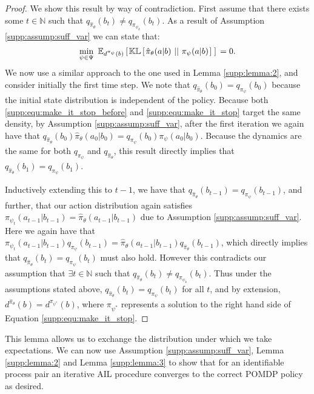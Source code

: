 \begin{proof}
    We show this result by way of contradiction.  First assume that there exists some $t \in \mathbb{N}$ such that $q_{\hat{\pi}_{\theta}}(b_t) \neq q_{\pi_{\psi_k}}(b_t)$.  As a result of Assumption \ref{supp:assump:suff_var} we can state that:
    \begin{equation}
            \min_{\psi \in \Psi} \ \mathbb{E}_{d^{\pi_{\psi}}(b)} \lspsqb{}  \mathbb{KL} \lspsqb{}  {\hat{\pi}_{\theta}}(a|b) \klbars{}  \pi_{\psi}(a|b) \rspsqb{}  \rspsqb{}  = 0.
    \end{equation}
    We now use a similar approach to the one used in Lemma \ref{supp:lemma:2}, and consider initially the first time step.  We note that $q_{\hat{\pi}_{\theta}}(b_0) = q_{\pi_{\psi}}(b_0)$ because the initial state distribution is independent of the policy.  Because both \eqref{supp:equ:make_it_stop_before} and \eqref{supp:equ:make_it_stop} target the same density, by Assumption \ref{supp:assump:suff_var}, after the first iteration we again have that $q_{\hat{\pi}_{\theta}}(b_0)\hat{\pi}_{\theta}(a_0|b_0) = q_{\pi_{\psi}}(b_0)\pi_{\psi}(a_0|b_0)$. Because the dynamics are the same for both $q_{\pi_{\psi}}$ and $q_{\hat{\pi}_{\theta}}$, this result directly implies that $q_{\hat{\pi}_{\theta}}(b_{1}) = q_{\pi_{\psi}}(b_{1})$.
    
    Inductively extending this to $t-1$, we have that $q_{\hat{\pi}_{\theta}}(b_{t-1}) = q_{\pi_{\psi}}(b_{t-1})$, and further, that our action distribution again satisfies  $\pi_{\psi_t}(a_{t-1}|b_{t-1}) = \hat{\pi}_{\theta}(a_{t-1}|b_{t-1})$ due to Assumption \ref{supp:assump:suff_var}. Here we again have that $\pi_{\psi_t}(a_{t-1}|b_{t-1})q_{\pi_{\psi}}(b_{t-1}) = \hat{\pi}_{\theta}(a_{t-1}|b_{t-1})q_{\hat{\pi}_{\theta}}(b_{t-1})$, which directly implies that $q_{\hat{\pi}_{\theta}}(b_{t}) = q_{\pi_{\psi}}(b_{t})$ must also hold. However this contradicts our assumption that $\exists t \in \mathbb{N}$ such that  $q_{\hat{\pi}_{\theta}}(b_t) \neq q_{\pi_{\psi_k}}(b_t)$. Thus under the assumptions stated above, $q_{\hat{\pi}_{\theta}}(b_t) = q_{\pi_{\psi}}(b_t)$ for all $t$, and by extension, $d^{\hat{\pi}_{\theta}}(b) = d^{\pi_{\psi^*}}(b)$, where $\pi_{\psi^*}$ represents a solution to the right hand side of Equation \eqref{supp:equ:make_it_stop}. 
\end{proof}

This lemma allows us to exchange the distribution under which we take expectations.  We can now use Assumption \ref{supp:assump:suff_var}, Lemma \ref{supp:lemma:2} and Lemma \ref{supp:lemma:3} to show that for an identifiable process pair an iterative AIL procedure converges to the correct POMDP policy as desired.

